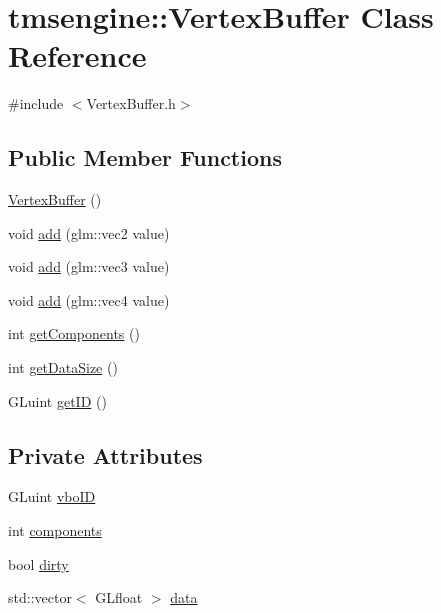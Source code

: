 \hypertarget{classtmsengine_1_1_vertex_buffer}{}\section{tmsengine\+:\+:Vertex\+Buffer Class Reference}
\label{classtmsengine_1_1_vertex_buffer}


{\ttfamily \#include $<$Vertex\+Buffer.\+h$>$}

\subsection*{Public Member Functions}
\begin{DoxyCompactItemize}
\item 
\hyperlink{classtmsengine_1_1_vertex_buffer_adb25d82a47ad82d5b69a75ac111401b8}{Vertex\+Buffer} ()
\item 
void \hyperlink{classtmsengine_1_1_vertex_buffer_ab1bf2eaca95ef9eaf2bacfa19dfbde5a}{add} (glm\+::vec2 value)
\item 
void \hyperlink{classtmsengine_1_1_vertex_buffer_a9c6d5ca7265694557c2f9142070eedc6}{add} (glm\+::vec3 value)
\item 
void \hyperlink{classtmsengine_1_1_vertex_buffer_adbaf46d318f9d12447e557f2a226fb03}{add} (glm\+::vec4 value)
\item 
int \hyperlink{classtmsengine_1_1_vertex_buffer_a765c3bda21961cd07f3422fd4cb4c2b5}{get\+Components} ()
\item 
int \hyperlink{classtmsengine_1_1_vertex_buffer_a1af72090f8fea7f93f43de8cefba9f4e}{get\+Data\+Size} ()
\item 
G\+Luint \hyperlink{classtmsengine_1_1_vertex_buffer_a5183f22e3747065c2ac77d50fa3935f4}{get\+ID} ()
\end{DoxyCompactItemize}
\subsection*{Private Attributes}
\begin{DoxyCompactItemize}
\item 
G\+Luint \hyperlink{classtmsengine_1_1_vertex_buffer_ab42f1676b7f61ab1b0e3ad9167914c41}{vbo\+ID}
\item 
int \hyperlink{classtmsengine_1_1_vertex_buffer_a1e06450b89acd7b5b73c85e2187908ca}{components}
\item 
bool \hyperlink{classtmsengine_1_1_vertex_buffer_a6b9ac4bfeff0c6dfe9a964246fef2824}{dirty}
\item 
std\+::vector$<$ G\+Lfloat $>$ \hyperlink{classtmsengine_1_1_vertex_buffer_aaf04b009201c9d710044c0bc748017e0}{data}
\end{DoxyCompactItemize}


